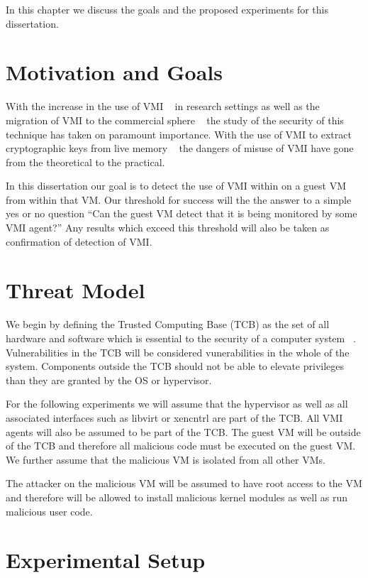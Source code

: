 In this chapter we discuss the goals and the proposed experiments for this dissertation. 
\section{Motivation and Goals}

	With the increase in the use of VMI ~\cite{payne_vmitools_2014, hay_forensics_2008, more_dynamic_2013, dolan-gavitt_leveraging_2011,hay_circumventing_2012} in research settings as well as the migration of VMI to the commercial sphere ~\cite{_vmware_2014} the study of the security of this technique has taken on paramount importance. With the use of VMI to extract cryptographic keys from live memory ~\cite{hay_circumventing_2012} the dangers of misuse of VMI have gone from the theoretical to the practical. 

	In this dissertation our goal is to detect the use of VMI within on a guest VM from within that VM. Our threshold for success will the the answer to a simple yes or no question ``Can the guest VM detect that it is being monitored by some VMI agent?'' Any results which exceed this threshold will also be taken as confirmation of detection of VMI.


\section{Threat Model}
	We begin by defining the Trusted Computing Base (TCB) as the set of all hardware and software which is essential to the security of a computer system ~\cite{rushby_critical_1994}. Vulnerabilities in the TCB will be considered vunerabilities in the whole of the system. Components outside the TCB should not be able to elevate privileges than they are granted by the OS or hypervisor. 

	For the following experiments we will assume that the hypervisor as well as all associated interfaces such as libvirt or xencntrl are part of the TCB. All VMI agents will also be assumed to be part of the TCB. The guest VM will be outside of the TCB and therefore all malicious code must be executed on the guest VM. We further assume that the malicious VM is isolated from all other VMs. 

	The attacker on the malicious VM will be assumed to have root access to the VM and therefore will be allowed to install malicious kernel modules as well as run malicious user code. 

\section{Experimental Setup}\label{Apparatus}

